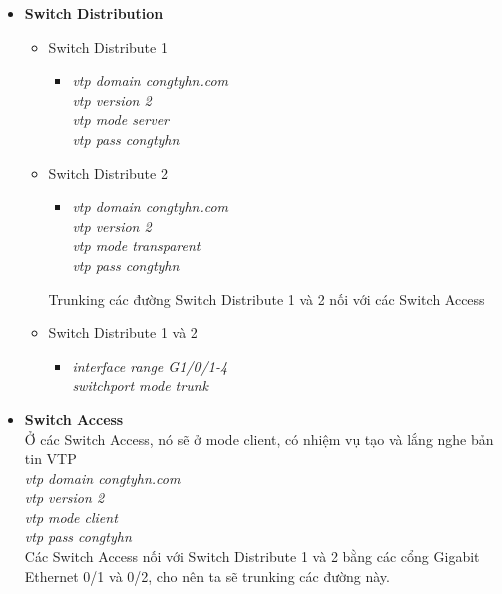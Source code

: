 \documentclass[12pt,a4paper]{report}
\begin{document}
\begin{itemize}
  \item \textbf{Switch Distribution}
    \begin{itemize}
    \item Switch Distribute 1
    \begin{itemize}
      \item \textit{vtp domain congtyhn.com \\
vtp version 2\\
vtp mode server\\
vtp pass congtyhn\\}
    \end{itemize}
    \item Switch Distribute 2
     \begin{itemize}
      \item \textit{vtp domain congtyhn.com\\
vtp version 2\\
vtp mode transparent\\
vtp pass congtyhn\\}  
    \end{itemize}
    \hspace*{1cm} Trunking các đường  Switch Distribute 1 và 2 nối với các Switch Access  \\
     \item Switch Distribute 1 và 2
     \begin{itemize}
      \item \textit{interface range G1/0/1-4\\
                    switchport mode trunk}   
    \end{itemize}
   \end{itemize}
  \item \textbf{Switch Access}\\
\hspace*{1cm} Ở các Switch Access, nó sẽ ở mode client, có nhiệm vụ tạo và lắng nghe bản tin VTP\\
\hspace*{2cm}\textit{vtp domain congtyhn.com \\
\hspace*{2cm}vtp version 2\\
\hspace*{2cm}vtp mode client\\
\hspace*{2cm}vtp pass congtyhn\\} 
\hspace*{1cm}Các Switch Access nối với Switch Distribute 1 và 2 bằng các cổng Gigabit Ethernet 0/1 và 0/2, cho nên ta sẽ trunking các đường này.\\

\end{itemize}
\end{document}

